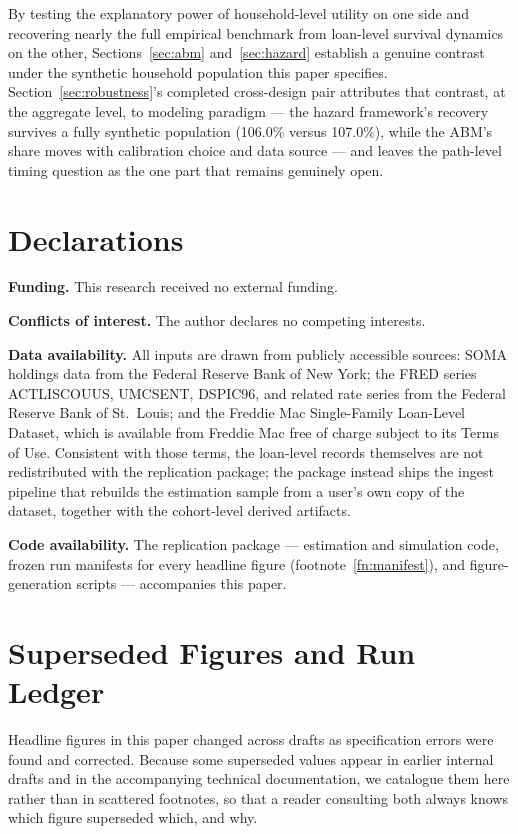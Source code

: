 \documentclass[12pt]{article}
\begin{document}
By testing the explanatory power of household-level utility on one side and recovering nearly the full empirical benchmark from loan-level survival dynamics on the other, Sections~\ref{sec:abm} and~\ref{sec:hazard} establish a genuine contrast under the synthetic household population this paper specifies. Section~\ref{sec:robustness}'s completed cross-design pair attributes that contrast, at the aggregate level, to modeling paradigm --- the hazard framework's recovery survives a fully synthetic population (106.0\% versus 107.0\%), while the ABM's share moves with calibration choice and data source --- and leaves the path-level timing question as the one part that remains genuinely open.

\section*{Declarations}

\textbf{Funding.} This research received no external funding.

\textbf{Conflicts of interest.} The author declares no competing interests.

\textbf{Data availability.} All inputs are drawn from publicly accessible sources: SOMA holdings data from the Federal Reserve Bank of New York; the FRED series ACTLISCOUUS, UMCSENT, DSPIC96, and related rate series from the Federal Reserve Bank of St.\ Louis; and the Freddie Mac Single-Family Loan-Level Dataset, which is available from Freddie Mac free of charge subject to its Terms of Use. Consistent with those terms, the loan-level records themselves are not redistributed with the replication package; the package instead ships the ingest pipeline that rebuilds the estimation sample from a user's own copy of the dataset, together with the cohort-level derived artifacts.

\textbf{Code availability.} The replication package --- estimation and simulation code, frozen run manifests for every headline figure (footnote~\ref{fn:manifest}), and figure-generation scripts --- accompanies this paper.

\appendix

\section{Superseded Figures and Run Ledger}\label{app:ledger}

Headline figures in this paper changed across drafts as specification errors were found and corrected. Because some superseded values appear in earlier internal drafts and in the accompanying technical documentation, we catalogue them here rather than in scattered footnotes, so that a reader consulting both always knows which figure superseded which, and why.
\end{document}
